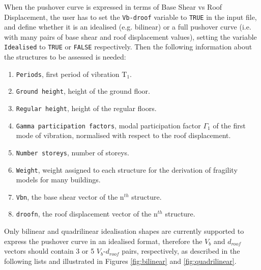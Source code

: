 When the pushover curve is expressed in terms of Base Shear vs Roof Displacement, the user has to set the \verb=Vb-droof= variable to \verb=TRUE= in the input file, and define whether it is an idealised (e.g. bilinear) or a full pushover curve (i.e. with many pairs of base shear and roof displacement values), setting the variable \verb=Idealised= to \verb=TRUE= or \verb=FALSE= respectively. Then the following information about the structures to be assessed is needed:\\

\begin{enumerate}
\item \verb=Periods=, first period of vibration T$_1$.
\item \verb=Ground height=, height of the ground floor.
\item \verb=Regular height=, height of the regular floors.
\item \verb=Gamma participation factors=, modal participation factor $\Gamma_1$ of the first mode of vibration, normalised with respect to the roof displacement.
\item \verb=Number storeys=, number of storeys.
\item \verb=Weight=, weight assigned to each structure for the derivation of fragility models for many buildings.
\item \verb=Vbn=, the base shear vector of the n$^{th}$ structure.
\item \verb=droofn=, the roof displacement vector of the n$^{th}$ structure. \\
\end{enumerate}

Only bilinear and quadrilinear idealisation shapes are currently supported to express the pushover curve in an idealised format, therefore the $V_b$ and $d_{roof}$ vectors should contain 3 or 5 $V_b$-$d_{roof}$ pairs, respectively, as described in the following lists and illustrated in Figures \ref{fig:bilinear} and \ref{fig:quadrilinear}.\\


